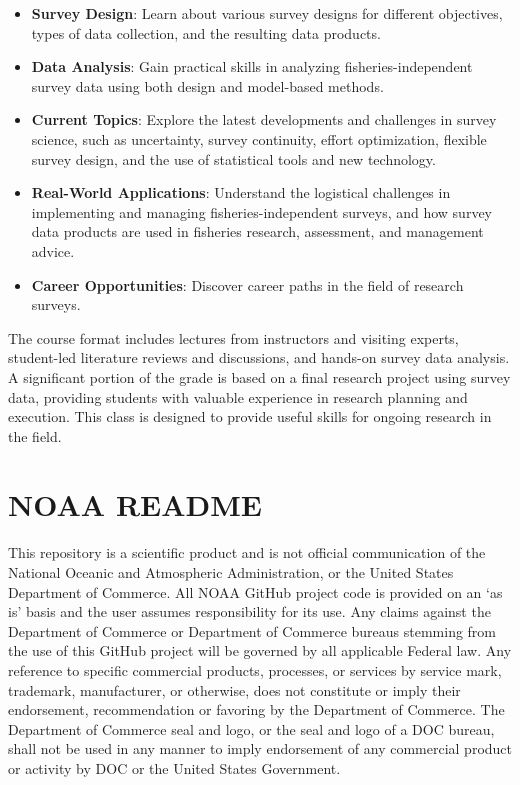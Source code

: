 \documentclass[
  letterpaper,
  oneside,
  open=any]{scrbook}
\providecommand{\tightlist}{%
  \setlength{\itemsep}{0pt}\setlength{\parskip}{0pt}}\usepackage{longtable,booktabs,array}
\begin{document}
\begin{itemize}
\tightlist
\item
  \textbf{Survey Design}: Learn about various survey designs for
  different objectives, types of data collection, and the resulting data
  products.
\item
  \textbf{Data Analysis}: Gain practical skills in analyzing
  fisheries-independent survey data using both design and model-based
  methods.
\item
  \textbf{Current Topics}: Explore the latest developments and
  challenges in survey science, such as uncertainty, survey continuity,
  effort optimization, flexible survey design, and the use of
  statistical tools and new technology.
\item
  \textbf{Real-World Applications}: Understand the logistical challenges
  in implementing and managing fisheries-independent surveys, and how
  survey data products are used in fisheries research, assessment, and
  management advice.
\item
  \textbf{Career Opportunities}: Discover career paths in the field of
  research surveys.
\end{itemize}

The course format includes lectures from instructors and visiting
experts, student-led literature reviews and discussions, and hands-on
survey data analysis. A significant portion of the grade is based on a
final research project using survey data, providing students with
valuable experience in research planning and execution. This class is
designed to provide useful skills for ongoing research in the field.

\section{NOAA README}\label{noaa-readme}

This repository is a scientific product and is not official
communication of the National Oceanic and Atmospheric Administration, or
the United States Department of Commerce. All NOAA GitHub project code
is provided on an `as is' basis and the user assumes responsibility for
its use. Any claims against the Department of Commerce or Department of
Commerce bureaus stemming from the use of this GitHub project will be
governed by all applicable Federal law. Any reference to specific
commercial products, processes, or services by service mark, trademark,
manufacturer, or otherwise, does not constitute or imply their
endorsement, recommendation or favoring by the Department of Commerce.
The Department of Commerce seal and logo, or the seal and logo of a DOC
bureau, shall not be used in any manner to imply endorsement of any
commercial product or activity by DOC or the United States Government.
\end{document}
